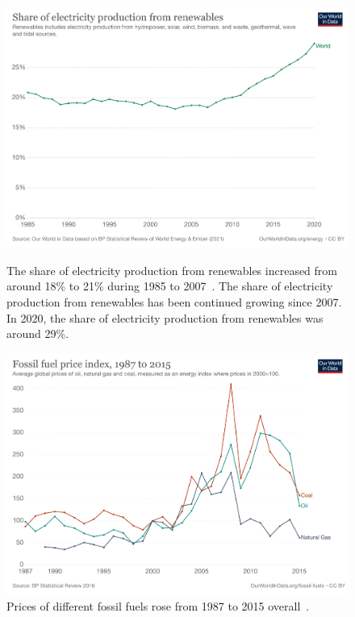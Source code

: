 \begin{figure}
\center
\includegraphics[scale=0.11]{img/intro_renewable.png}
\caption{The share of electricity production from renewables increased from around 18\% to 21\% during 1985 to 2007~\cite{BP2021bp}. The share of electricity production from renewables has been continued growing since 2007. In 2020, the share of electricity production from renewables was around 29\%.}
\label{intro_renewable} %

\includegraphics[scale=0.11]{img/intro_fossil-fuel-price-index.png}
\caption{Prices of different fossil fuels rose from 1987 to 2015 overall~\cite{BP2016bp}.}
\label{intro_fossil-fuel-price-index}
\end{figure} %

